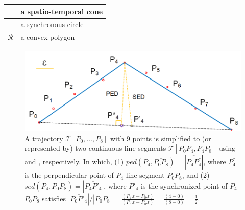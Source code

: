 \begin{table}
\begin{tabular}{|c|l|}
		\cone{} & a spatio-temporal cone \\		\hline
		\circle{} & a synchronous circle \\		\hline
		$\mathcal{R}$& a convex polygon \\		\hline
	\end{tabular}
	\label{tab:notations}
	\vspace{-1ex}
\end{table}


\begin{figure}[tb!]
	\centering
	\includegraphics[scale=0.9]{Figures/Fig-Concepts.png}\vspace{-1ex}
	\caption{\small  A trajectory $\dddot{\mathcal{T}}[P_0, \ldots, P_{8}]$ with 9 points is simplified to (or represented by) two continuous line segments $ \overline{\mathcal{T}}[\overline{P_0P_4}, \overline{P_4P_{8}}] $ using \ped and \sed, respectively. In which, (1) $ped(P_4, \overline{P_0P_{8}})=|\overline{P_4P^*_4}|$, where $P^*_4$ is the perpendicular point of $P_4$ \wrt line segment $\overline{P_0P_{8}}$, and (2) $sed(P_4, \overline{P_0P_{8}})= |\overline{P_4P'_4}|$, where $P'_4$ is the synchronized point of $P_4$ \wrt $\overline{P_0P_{8}}$ satisfies ${|\overline{P_0P'_4}|}/{|\overline{P_0P_{8}}|} = \frac{(P_4.t - P_0.t)}{(P_{8}.t-P_0.t)} = \frac{(4-0)}{(8-0)}= \frac{1}{2}$.}
	\vspace{-1ex}
	\label{fig:concepts}
\end{figure}


